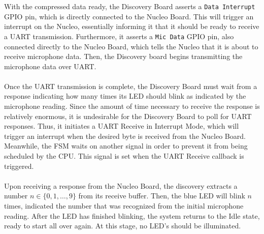 With the compressed data ready, the Discovery Board asserts a \texttt{Data Interrupt} GPIO pin,
which is directly connected to the Nucleo Board. This will trigger an interrupt on the Nucleo,
essentially informing it that it should be ready to receive a UART transmission. Furthermore, it
asserts a \texttt{Mic Data} GPIO pin, also connected directly to the Nucleo Board, which tells the
Nucleo that it is about to receive microphone data. Then, the Discovery
board begins transmitting the microphone data over UART.\\\\
Once the UART transmission is complete, the Discovery Board must wait from a response indicating how
many times its LED should blink as indicated by the microphone reading. Since the amount of time
necessary to receive the response is relatively enormous, it is undesirable for the Discovery Board
to poll for UART responses. Thus, it initiates a UART Receive in Interrupt Mode, which will trigger
an interrupt when the desired byte is received from the Nucleo Board. Meanwhile, the FSM waits on
another signal in order to prevent it from being scheduled by the CPU. This signal is set when the
UART Receive callback is triggered.\\\\
Upon receiving a response from the Nucleo Board, the discovery extracts a number
$n\in\{0,1,\dots,9\}$ from its receive buffer. Then, the blue LED will blink $n$ times, indicated
the number that was recognized from the initial microphone reading. After the LED has finished
blinking, the system returns to the Idle state, ready to start all over again. At this stage, no
LED's should be illuminated.
